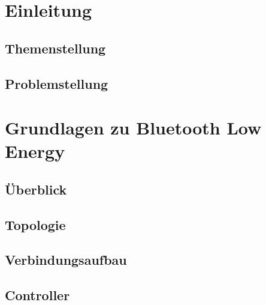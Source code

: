 \documentclass[doktyp=barbeit]{TUBAFarbeiten}
\begin{document}
\maketitle

\TUBAFErklaerungsseite



\tableofcontents
\newpage
\listoffigures
\listoftables

\newpage
\section{Einleitung}

	\subsection{Themenstellung}
		

	\subsection{Problemstellung}
		

\newpage
\section{Grundlagen zu Bluetooth Low Energy}

	\subsection{Überblick}
		

	\subsection{Topologie}
		

	\subsection{Verbindungsaufbau}
		

	\subsection{Controller}
		
\end{document}
